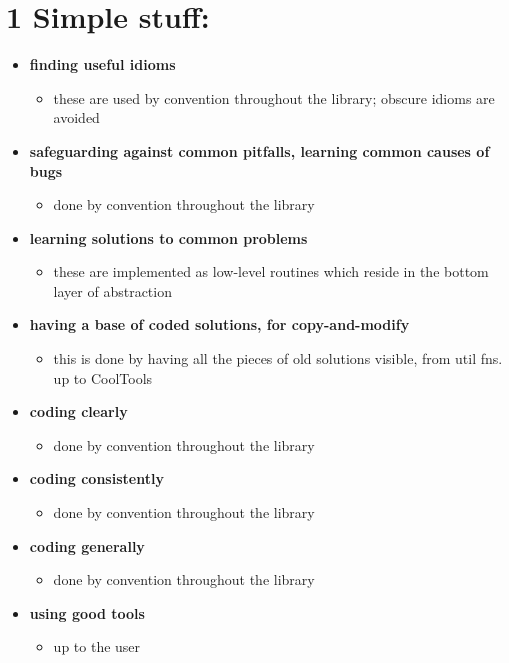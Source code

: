 \section*{1  Simple stuff:}
\begin{itemize}
\item {\bf finding useful idioms}
	\begin{itemize}
	\item these are used by convention throughout the library; obscure idioms are
			avoided
	\end{itemize}
\item {\bf safeguarding against common pitfalls, learning common causes of bugs}
	\begin{itemize}
	\item done by convention throughout the library
	\end{itemize}
\item {\bf learning solutions to common problems}
	\begin{itemize}
	\item these are implemented as low-level routines which reside in the bottom
			layer of abstraction
	\end{itemize}
\item {\bf having a base of coded solutions, for copy-and-modify}
	\begin{itemize}
	\item this is done by having all the pieces of old solutions visible, from
			util fns. up to CoolTools		
	\end{itemize}
\item {\bf coding clearly}
	\begin{itemize}
	\item done by convention throughout the library
	\end{itemize}
\item {\bf coding consistently}
	\begin{itemize}
	\item done by convention throughout the library
	\end{itemize}
\item {\bf coding generally}
	\begin{itemize}
	\item done by convention throughout the library
	\end{itemize}
\item {\bf using good tools}
	\begin{itemize}
	\item up to the user
	\end{itemize}

\end{itemize}
